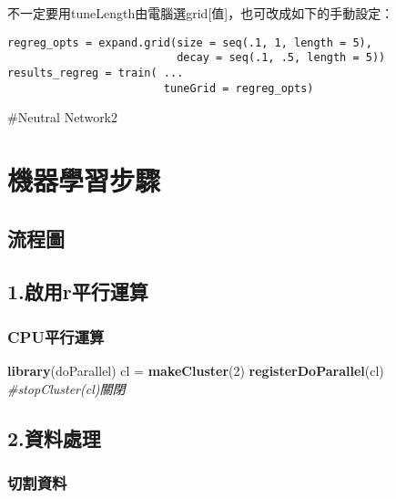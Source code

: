 \documentclass[]{book}
\newenvironment{Shaded}{\begin{snugshade}}{\end{snugshade}}
\newcommand{\KeywordTok}[1]{\textcolor[rgb]{0.13,0.29,0.53}{\textbf{#1}}}
\newcommand{\DecValTok}[1]{\textcolor[rgb]{0.00,0.00,0.81}{#1}}
\newcommand{\StringTok}[1]{\textcolor[rgb]{0.31,0.60,0.02}{#1}}
\newcommand{\CommentTok}[1]{\textcolor[rgb]{0.56,0.35,0.01}{\textit{#1}}}
\newcommand{\NormalTok}[1]{#1}
\begin{document}
不一定要用tuneLength由電腦選grid{[}值{]}，也可改成如下的手動設定：

\begin{verbatim}
regreg_opts = expand.grid(size = seq(.1, 1, length = 5),
                          decay = seq(.1, .5, length = 5)) 
results_regreg = train( ...
                        tuneGrid = regreg_opts)
\end{verbatim}

\#Neutral Network2

\hypertarget{-1}{%
\section{機器學習步驟}\label{-1}}

\hypertarget{-1}{%
\subsection{流程圖}\label{-1}}

\hypertarget{r}{%
\subsection{1.啟用r平行運算}\label{r}}

\hypertarget{cpu-1}{%
\subsubsection{CPU平行運算}\label{cpu-1}}

\begin{Shaded}
\begin{Highlighting}[]
\KeywordTok{library}\NormalTok{(doParallel)}
\NormalTok{cl =}\StringTok{ }\KeywordTok{makeCluster}\NormalTok{(}\DecValTok{2}\NormalTok{)}
\KeywordTok{registerDoParallel}\NormalTok{(cl)}
\CommentTok{#stopCluster(cl)關閉}
\end{Highlighting}
\end{Shaded}

\subsection{2.資料處理}

\hypertarget{-1}{%
\subsubsection{切割資料}\label{-1}}
\end{document}
